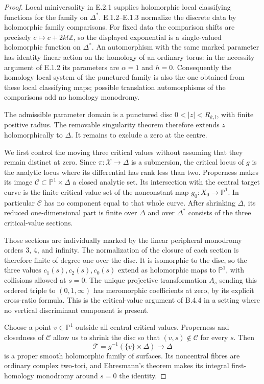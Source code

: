 \begin{proof}
Local miniversality in E.2.1 supplies holomorphic local
classifying functions for the family on $\Delta^*$.
E.1.2--E.1.3 normalize the discrete data by holomorphic
family comparisons.  For fixed data the comparison shifts
are precisely $c\mapsto c+2kl\mathbb Z$, so the displayed
exponential is a single-valued holomorphic function on
$\Delta^*$.  An automorphism with the same marked parameter
has identity linear action on the homology of an ordinary
torus: in the necessity argument of E.1.2 its parameters
are $\alpha=1$ and $h=0$.  Consequently the homology local
system of the punctured family is also the one obtained
from these local classifying maps; possible translation
automorphisms of the comparisons add no homology monodromy.

The admissible parameter domain is a punctured disc
$0<|z|<R_{k,l}$, with finite positive radius.  The removable
singularity theorem therefore extends $z$ holomorphically
to $\Delta$.  It remains to exclude a zero at the centre.

We first control the moving three critical values without
assuming that they remain distinct at zero.  Since
$\pi:\mathcal X\to\Delta$ is a submersion, the critical
locus of $g$ is the analytic locus where its differential
has rank less than two.  Properness makes its image
\(\mathcal C\subset\mathbb P^1\times\Delta\) a closed
analytic set.  Its intersection with the central target
curve is the finite critical-value set of the nonconstant
map $g_0:X_0\to\mathbb P^1$.  In particular
$\mathcal C$ has no component equal to that whole curve.
After shrinking $\Delta$, its reduced one-dimensional
part is finite over $\Delta$ and over $\Delta^*$ consists
of the three critical-value sections.

Those sections are individually marked by the linear
peripheral monodromy orders $3$, $4$, and infinity.
The normalization of the closure of each section is
therefore finite of degree one over the disc.  It is
isomorphic to the disc, so the three values
$c_1(s),c_2(s),c_0(s)$ extend as holomorphic maps to
$\mathbb P^1$, with collisions allowed at $s=0$.
The unique projective transformation $A_s$ sending this
ordered triple to $(0,1,\infty)$ has meromorphic
coefficients at zero, by its explicit cross-ratio formula.
This is the critical-value argument of B.4.4 in a setting
where no vertical discriminant component is present.

Choose a point $v\in\mathbb P^1$ outside all central
critical values.  Properness and closedness of
$\mathcal C$ allow us to shrink the disc so that
$(v,s)\notin\mathcal C$ for every $s$.  Then
\[
 \mathcal T=g^{-1}(\{v\}\times\Delta)\longrightarrow\Delta
\]
is a proper smooth holomorphic family of surfaces.
Its noncentral fibres are ordinary complex two-tori, and
Ehresmann's theorem makes its integral first-homology
monodromy around $s=0$ the identity.


\end{proof}
